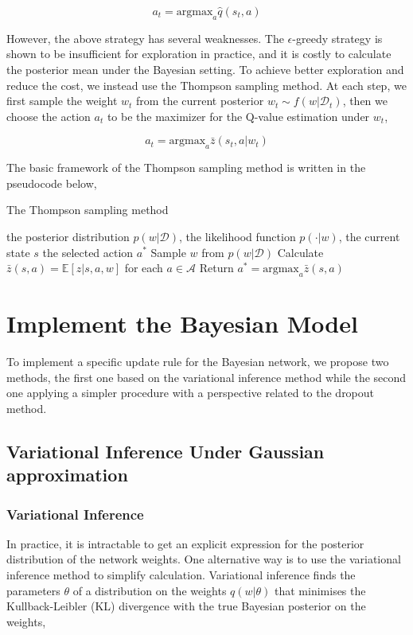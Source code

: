 \documentclass[a4paper,12pt]{article}
\begin{document}
\begin{equation}
a_t = \textrm{argmax}_a \hat{q}(s_t, a)
\end{equation}

However, the above strategy has several weaknesses. The $\epsilon$-greedy strategy is shown to be insufficient for exploration in practice, and it is costly to calculate the posterior mean under the Bayesian setting. To achieve better exploration and reduce the cost, we instead use the Thompson sampling method. At each step, we first sample the weight $w_t$ from the current posterior $w_t \sim f(w | \mathcal{D}_t)$, then we choose the action $a_t$ to be the maximizer for the Q-value estimation under $w_t$, 

\begin{equation}
a_t = \textrm{argmax}_a \bar{z}(s_t, a | w_t)
\end{equation}

The basic framework of the Thompson sampling method is written in the pseudocode below, 

\begin{algorithm}[htb]
\begin{algorithmic}[1]
\caption{The Thompson sampling method}
\Require the posterior distribution $p(w | \mathcal{D})$, the likelihood function $p(\cdot | w)$, the current state $s$
\Ensure the selected action $a^*$
\State Sample $w$ from $p(w | \mathcal{D})$
\State Calculate $\bar{z}(s, a) = \mathbb{E}[z | s, a, w]$ for each $a\in\mathcal{A}$
\State Return $a^* = \textrm{argmax}_a\bar{z}(s, a)$ 
\end{algorithmic}
\end{algorithm}


\section{Implement the Bayesian Model}
To implement a specific update rule for the Bayesian network, we propose two methods, the first one based on the variational inference method while the second one applying a simpler procedure with a perspective related to the dropout method. 

\subsection{Variational Inference Under Gaussian approximation}
\subsubsection{Variational Inference}
In practice, it is intractable to get an explicit expression for the posterior distribution of the network weights. One alternative way is to use the variational inference method to simplify calculation. Variational inference finds the parameters $\theta$ of a distribution on the weights $q(w|\theta)$ that minimises the Kullback-Leibler (KL) divergence with the true Bayesian posterior on the weights,
\end{document}
